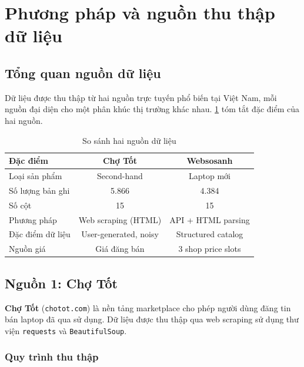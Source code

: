 \section{Phương pháp và nguồn thu thập dữ liệu}
\label{sec:data-collection}

\subsection{Tổng quan nguồn dữ liệu}

Dữ liệu được thu thập từ hai nguồn trực tuyến phổ biến tại Việt Nam, mỗi nguồn đại diện cho một phân khúc thị trường khác nhau. \cref{tab:data-sources} tóm tắt đặc điểm của hai nguồn.

\begin{table}[H]
    \centering
    \caption{So sánh hai nguồn dữ liệu}
    \label{tab:data-sources}
    \begin{tabular}{lcc}
        \toprule
        \textbf{Đặc điểm} & \textbf{Chợ Tốt} & \textbf{Websosanh} \\
        \midrule
        Loại sản phẩm     & Second-hand       & Laptop mới \\
        Số lượng bản ghi   & 5.866             & 4.384 \\
        Số cột             & 15                & 15 \\
        Phương pháp        & Web scraping (HTML) & API + HTML parsing \\
        Đặc điểm dữ liệu  & User-generated, noisy & Structured catalog \\
        Nguồn giá          & Giá đăng bán      & 3 shop price slots \\
        \bottomrule
    \end{tabular}
\end{table}

\subsection{Nguồn 1: Chợ Tốt}
\label{subsec:chotot-collection}

\textbf{Chợ Tốt} (\texttt{chotot.com}) là nền tảng marketplace cho phép người dùng đăng tin bán laptop đã qua sử dụng. Dữ liệu được thu thập qua web scraping\cite{mitchell2018scraping} sử dụng thư viện \texttt{requests}\cite{reitz2011requests} và \texttt{BeautifulSoup}\cite{richardson2007bs4}.

\subsubsection{Quy trình thu thập}

